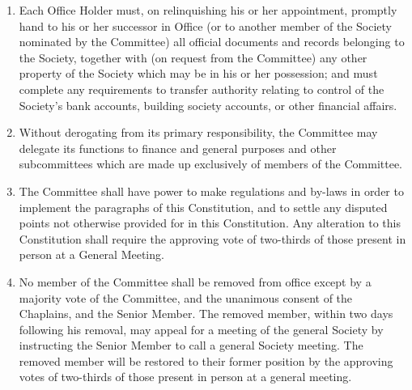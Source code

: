 \documentclass[11pt]{article}
\begin{document}
\begin{enumerate}
\item Each Office Holder must, on relinquishing his or her appointment, promptly hand to his or her successor in Office (or to another member of the Society nominated by the Committee) all official documents and records belonging to the Society, together with (on request from the Committee) any other property of the Society which may be in his or her possession; and must complete any requirements to transfer authority relating to control of the Society's bank accounts, building society accounts, or other financial affairs.
\item Without derogating from its primary responsibility, the Committee may delegate its functions to finance and general purposes and other subcommittees which are made up exclusively of members of the Committee.
\item The Committee shall have power to make regulations and by-laws in order to implement the paragraphs of this Constitution, and to settle any disputed points not otherwise provided for in this Constitution. Any alteration to this Constitution shall require the approving vote of two-thirds of those present in person at a General Meeting.
\item No member of the Committee shall be removed from office except by a majority vote of the Committee, and the unanimous consent of the Chaplains, and the Senior Member. The removed member, within two days following his removal, may appeal for a meeting of the general Society by instructing the Senior Member to call a general Society meeting. The removed member will be restored to their former position by the approving votes of two-thirds of those present in person at a general meeting.
\end{enumerate}
\end{document}
